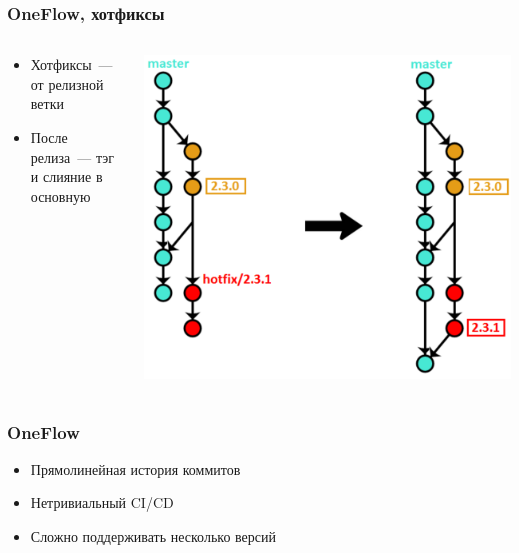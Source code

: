 \documentclass{../../slides-style}
\begin{document}
    \begin{frame}
        \frametitle{OneFlow, хотфиксы}
        \begin{columns}
            \begin{column}{0.4\textwidth}
                \begin{itemize}
                    \item Хотфиксы~--- от релизной ветки
                    \item После релиза~--- тэг и слияние в основную
                \end{itemize}
            \end{column}
            \begin{column}{0.6\textwidth}
                \begin{center}
                    \includegraphics[height=0.7\textheight]{oneflow5.png}
                \end{center}
            \end{column}
        \end{columns}
    \end{frame}

    \begin{frame}
        \frametitle{OneFlow}
        \begin{itemize}
            \item Прямолинейная история коммитов
            \item Нетривиальный CI/CD
            \item Сложно поддерживать несколько версий
        \end{itemize}
    \end{frame}
\end{document}

